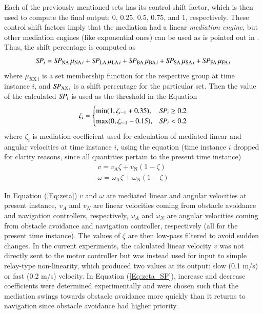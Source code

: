 Each of the previously mentioned sets has its control shift factor, which is then used to compute the final output: 0, 0.25, 0.5, 0.75, and 1, respectively. These control shift factors imply that the mediation had a linear \textit{mediation engine}, but other mediation engines (like exponential ones) can be used as is pointed out in \cite{Vincenti2009}. Thus, the shift percentage is computed as
\[
    \mathit{SP}_i = \mathit{SP}_{\textrm{NA}} \, \mu_{{\textrm{NA}}\,i} + \mathit{SP}_{\textrm{LA}} \, \mu_{{\textrm{LA}}\,i} + \mathit{SP}_{\textrm{BA}} \, \mu_{{\textrm{BA}}\,i} + \mathit{SP}_{\textrm{SA}} \, \mu_{{\textrm{SA}}\,i} + \mathit{SP}_{\textrm{FA}} \, \mu_{{\textrm{FA}}\,i}
\]
where $\mu_{\textrm{XX}\,i}$ is a set membership function for the respective group at time instance $i$, and $\mathit{SP}_{\textrm{XX}\,i}$ is a shift percentage for the particular set. Then the value of the calculated $\mathit{SP}_i$ is used as the threshold in the Equation
\begin{equation}
    \label{Eq:zeta_SP}
    \zeta_{i} =
    \begin{cases}
    \min(1, \zeta_{i-1}+0.35), & \mathit{SP}_i\geq 0.2 \\
    \max(0, \zeta_{i-1}-0.15), & \mathit{SP}_i < 0.2
    \end{cases}
\end{equation}
where $\zeta_i$ is mediation coefficient used for calculation of mediated linear and angular velocities at time instance $i$, using the equation (time instance $i$ dropped for clarity reasons, since all quantities pertain to the present time instance)
\begin{equation}
    \begin{split}
     v = v_\textrm{A}\zeta + v_\textrm{N}(1-\zeta)\\
    \omega = \omega_\textrm{A}\zeta + \omega_\textrm{N}(1-\zeta)
    \end{split}
    \label{Eq:zeta}
\end{equation}

In Equation (\ref{Eq:zeta}) $v$ and $\omega$ are mediated linear and angular velocities at present instance, $v_A$ and $v_N$ are linear velocities coming from obstacle avoidance and navigation controllers, respectively, $\omega_A$ and $\omega_N$ are angular velocities coming from obstacle avoidance and navigation controller, respectively (all for the present time instance). The values of $\zeta$ are then low-pass filtered to avoid sudden changes. In the current experiments, the calculated linear velocity $v$ was not directly sent to the motor controller but was instead used for input to simple relay-type non-linearity, which produced two values at its output: slow (0.1 m/s) or fast (0.2 m/s) velocity. In Equation (\ref{Eq:zeta_SP}), increase and decrease coefficients were determined experimentally and were chosen such that the mediation swings towards obstacle avoidance more quickly than it returns to navigation since obstacle avoidance had higher priority. 

